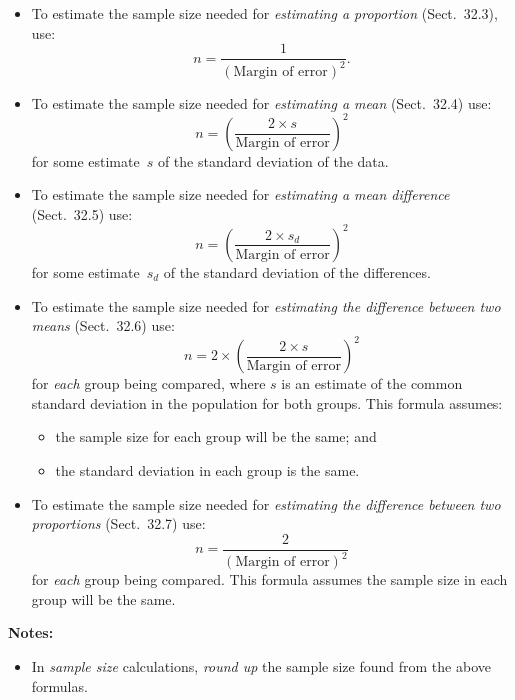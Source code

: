 \documentclass[
  11pt,
  a4paper,
  krantz2]{krantz}
\providecommand{\tightlist}{%
  \setlength{\itemsep}{0pt}\setlength{\parskip}{0pt}}
\begin{document}
\begin{itemize}
\item
  To estimate the sample size needed for \emph{estimating a proportion} (Sect.~32.3), use:\\
  \[
   n = \frac{1}{(\text{Margin of error})^2}.
  \]
\item
  To estimate the sample size needed for \emph{estimating a mean} (Sect.~32.4) use:\\
  \[
   n = \left( \frac{2\times s}{\text{Margin of error}}\right)^2
  \]
  for some estimate~\(s\) of the standard deviation of the data.
\item
  To estimate the sample size needed for \emph{estimating a mean difference} (Sect.~32.5) use:\\
  \[
   n = \left( \frac{2 \times s_d}{\text{Margin of error}}\right)^2
  \]
  for some estimate~\(s_d\) of the standard deviation of the differences.
\item
  To estimate the sample size needed for \emph{estimating the difference between two means} (Sect.~32.6) use:\\
  \[
   n = 2\times \left( \frac{2 \times s}{\text{Margin of error}}\right)^2
  \]
  for \emph{each} group being compared, where \(s\) is an estimate of the common standard deviation in the population for both groups.
  This formula assumes:

  \begin{itemize}
  \tightlist
  \item
    the sample size for each group will be the same; and
  \item
    the standard deviation in each group is the same.
  \end{itemize}
\item
  To estimate the sample size needed for \emph{estimating the difference between two proportions} (Sect.~32.7) use:\\
  \[
   n = \frac{2}{(\text{Margin of error})^2}
  \]
  for \emph{each} group being compared.
  This formula assumes the sample size in each group will be the same.
\end{itemize}

\textbf{Notes:}

\begin{itemize}
\tightlist
\item
  In \emph{sample size} calculations, \emph{round up} the sample size found from the above formulas.
\end{itemize}

\pagebreak
\end{document}
